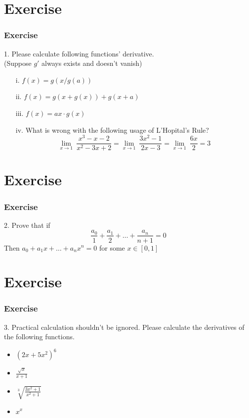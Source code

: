 \documentclass[12pt, t]{beamer}
\begin{document}
\section{Exercise}
\begin{frame}
    \frametitle{Exercise}
    1. Please calculate following functions' derivative.\\(Suppose $g'$ always exists and doesn't vanish)
    \begin{enumerate}
        \item[i.]   $f(x)=g(x/g(a))$
        \item[ii.]  $f(x)=g(x+g(x))+{g(x+a)}$
        \item[iii.] $f(x) =ax\cdot g(x)$
        \item[iv.]  What is wrong with the following usage of L'Hopital's Rule?\\
            \begin{equation*}
                \underset{x\rightarrow 1}{\lim}\ \frac{x^3-x-2}{x^2-3x+2}=\underset{x\rightarrow 1}{\lim}\ \frac{3x^2-1}{2x-3}=\underset{x\rightarrow 1}{\lim}\ \frac{6x}{2}=3
            \end{equation*}
    \end{enumerate}
\end{frame}


\section{Exercise}
\begin{frame}
    \frametitle{Exercise}
    2. Prove that if
    \begin{equation*}
        \frac{a_0}{1}+\frac{a_1}{2}+\dots+\frac{a_n}{n+1}=0
    \end{equation*}
    Then $a_0+a_1x+\dots+a_nx^n=0$ for some $x\in[0,1]$
\end{frame}


\section{Exercise}
\begin{frame}
    \frametitle{Exercise}
    3. Practical calculation shouldn't be ignored. Please calculate the derivatives of the following functions.
    \begin{itemize}
        \item $(2x+5x^2)^6$
              \vspace{0.3em}
        \item $\frac{\sqrt{x}}{x+1}$
              \vspace{0.3em}
        \item $\sqrt[3]{\frac{3x^2+1}{x^2+1}}$
              \vspace{0.3em}
        \item $x^{x}$
    \end{itemize}

\end{frame}
\end{document}
